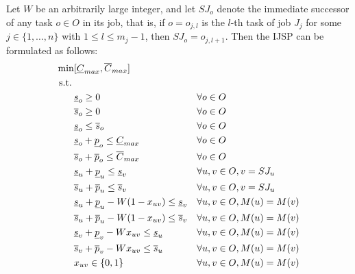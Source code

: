 \documentclass[icae]{iosart2x}
\newcommand{\reviewed}[1]{#1} %
\begin{document}
\reviewed{Let $W$ be an arbitrarily large integer, and let $SJ_o$ denote the immediate successor of any task $o \in O$ in its job, that is, if $o=o_{j,l}$ is the $l$-th task of job $J_j$ for some $j \in \{1,\ldots,n\}$ with $1 \leq l \leq m_j-1$, then $SJ_o=o_{j,l+1}$. Then the IJSP can be formulated as follows:}
\begin{align}
\min & [\underline{C}_{max},\overline{C}_{max}] && \label{eqObjFunction}\\
\text{s.t.} \: &  &&\notag\\
 & \underline{s}_o \geq 0 && \forall o \in O \label{constUnderSgeq0}\\
 & \overline{s}_o \geq 0  &&  \forall o \in O  \label{constOverSgeq0}\\
&  \underline{s}_o \leq \overline{s}_o && \forall o \in O \label{constSInterval}\\
 & \underline{s}_o +  \underline{p}_o \leq \underline{C}_{max} && \forall o \in O \label{constUnderCmax}\\
 & \overline{s}_o +  \overline{p}_o \leq \overline{C}_{max} &&  \forall o \in O \label{constOverCmax}\\
  & \underline{s}_u + \underline{p}_u \leq \underline{s}_v && \forall u,v \in O,  v = SJ_u \label{constUnderJobPrec}\\
 &\overline{s}_u + \overline{p}_u \leq \overline{s}_v && \forall u,v \in O, v = SJ_u \label{constOverJobPrec}\\
 & \underline{s}_u + \underline{p}_u - W(1-x_{uv}) \leq \underline{s}_v && \forall u,v \in O,  M(u)=M(v) \label{constUnderOverlap1}\\
 & \overline{s}_u + \overline{p}_u - W(1-x_{uv}) \leq \overline{s}_v && \forall u,v \in O,  M(u)=M(v)  \label{constOverOverlap1}\\
 & \underline{s}_v + \underline{p}_v - W x_{uv} \leq \underline{s}_u && \forall u,v \in O,  M(u)=M(v) \label{constUnderOverlap2}\\
 & \overline{s}_v + \overline{p}_v- W x_{uv} \leq \overline{s}_u && \forall u,v \in O,  M(u)=M(v)  \label{constOverOverlap2}\\
&  x_{uv} \in \{0,1\} && \forall u,v \in O,  M(u)=M(v)
 \end{align}
\end{document}
